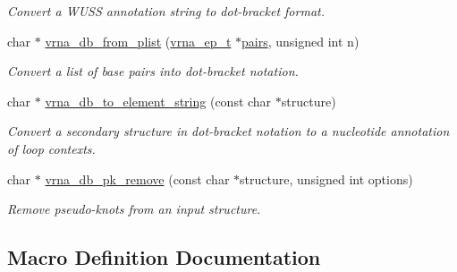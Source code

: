 \begin{DoxyCompactItemize}
\begin{DoxyCompactList}\small\item\em Convert a W\+U\+SS annotation string to dot-\/bracket format. \end{DoxyCompactList}\item 
char $\ast$ \mbox{\hyperlink{group__struct__utils__dot__bracket_ga6a51a36b9245d0bac868c5cd172b9611}{vrna\+\_\+db\+\_\+from\+\_\+plist}} (\mbox{\hyperlink{group__struct__utils__plist_gab9ac98ab55ded9fb90043b024b915aca}{vrna\+\_\+ep\+\_\+t}} $\ast$\mbox{\hyperlink{group__struct__utils__deprecated_ga6341cbb704924824e0236c1dce791032}{pairs}}, unsigned int n)
\begin{DoxyCompactList}\small\item\em Convert a list of base pairs into dot-\/bracket notation. \end{DoxyCompactList}\item 
char $\ast$ \mbox{\hyperlink{group__struct__utils__dot__bracket_ga45360c09fb6d04d96e42dcccbb66015b}{vrna\+\_\+db\+\_\+to\+\_\+element\+\_\+string}} (const char $\ast$structure)
\begin{DoxyCompactList}\small\item\em Convert a secondary structure in dot-\/bracket notation to a nucleotide annotation of loop contexts. \end{DoxyCompactList}\item 
char $\ast$ \mbox{\hyperlink{group__struct__utils__dot__bracket_ga97dbebaa3fc49524cf5afa338a6c52ee}{vrna\+\_\+db\+\_\+pk\+\_\+remove}} (const char $\ast$structure, unsigned int options)
\begin{DoxyCompactList}\small\item\em Remove pseudo-\/knots from an input structure. \end{DoxyCompactList}\end{DoxyCompactItemize}


\subsection{Macro Definition Documentation}
\mbox{\label{group__struct__utils__dot__bracket_ga7e3f630af8d69bb0e917145aacf2f96d}} 
